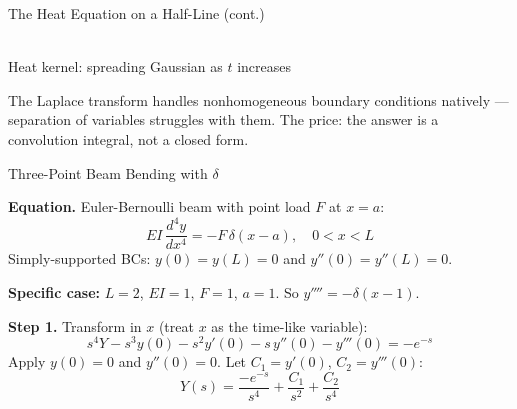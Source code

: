 \documentclass[aspectratio=169,11pt]{beamer}
\begin{document}
\begin{frame}{The Heat Equation on a Half-Line (cont.)}
\footnotesize
\centering
{}\\[1mm]
{\footnotesize Heat kernel: spreading Gaussian as $t$ increases}
\vspace{3mm}
\begin{conceptbox}
The Laplace transform handles nonhomogeneous boundary conditions natively --- separation of variables struggles with them. The price: the answer is a convolution integral, not a closed form.
\end{conceptbox}
\end{frame}

\begin{frame}{Three-Point Beam Bending with $\delta$}
\footnotesize
\begin{examplebox}
\textbf{Equation.} Euler-Bernoulli beam with point load $F$ at $x = a$:
\[EI\,\frac{d^4 y}{dx^4} = -F\,\delta(x - a), \quad 0 < x < L\]
Simply-supported BCs: $y(0) = y(L) = 0$ and $y''(0) = y''(L) = 0$.

\medskip
\textbf{Specific case:} $L = 2$, $EI = 1$, $F = 1$, $a = 1$. So $y'''' = -\delta(x-1)$.

\textbf{Step 1.} Transform in $x$ (treat $x$ as the time-like variable):
\[s^4 Y - s^3 y(0) - s^2 y'(0) - s\, y''(0) - y'''(0) = -e^{-s}\]
Apply $y(0) = 0$ and $y''(0) = 0$. Let $C_1 = y'(0)$, $C_2 = y'''(0)$:
\[Y(s) = \frac{-e^{-s}}{s^4} + \frac{C_1}{s^2} + \frac{C_2}{s^4}\]
\end{examplebox}
\end{frame}
\end{document}
